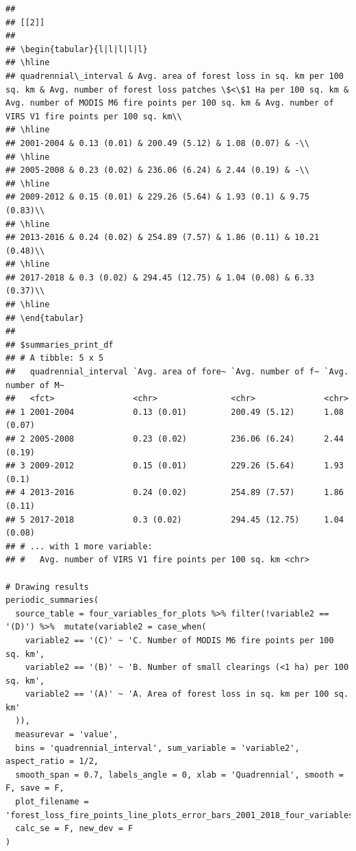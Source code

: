 \documentclass[10pt,landscape,a3paper]{article}
\begin{document}
\begin{verbatim}
## 
## [[2]]
## 
## \begin{tabular}{l|l|l|l|l}
## \hline
## quadrennial\_interval & Avg. area of forest loss in sq. km per 100 sq. km & Avg. number of forest loss patches \$<\$1 Ha per 100 sq. km & Avg. number of MODIS M6 fire points per 100 sq. km & Avg. number of VIRS V1 fire points per 100 sq. km\\
## \hline
## 2001-2004 & 0.13 (0.01) & 200.49 (5.12) & 1.08 (0.07) & -\\
## \hline
## 2005-2008 & 0.23 (0.02) & 236.06 (6.24) & 2.44 (0.19) & -\\
## \hline
## 2009-2012 & 0.15 (0.01) & 229.26 (5.64) & 1.93 (0.1) & 9.75 (0.83)\\
## \hline
## 2013-2016 & 0.24 (0.02) & 254.89 (7.57) & 1.86 (0.11) & 10.21 (0.48)\\
## \hline
## 2017-2018 & 0.3 (0.02) & 294.45 (12.75) & 1.04 (0.08) & 6.33 (0.37)\\
## \hline
## \end{tabular}
## 
## $summaries_print_df
## # A tibble: 5 x 5
##   quadrennial_interval `Avg. area of fore~ `Avg. number of f~ `Avg. number of M~
##   <fct>                <chr>               <chr>              <chr>             
## 1 2001-2004            0.13 (0.01)         200.49 (5.12)      1.08 (0.07)       
## 2 2005-2008            0.23 (0.02)         236.06 (6.24)      2.44 (0.19)       
## 3 2009-2012            0.15 (0.01)         229.26 (5.64)      1.93 (0.1)        
## 4 2013-2016            0.24 (0.02)         254.89 (7.57)      1.86 (0.11)       
## 5 2017-2018            0.3 (0.02)          294.45 (12.75)     1.04 (0.08)       
## # ... with 1 more variable:
## #   Avg. number of VIRS V1 fire points per 100 sq. km <chr>

# Drawing results
periodic_summaries(
  source_table = four_variables_for_plots %>% filter(!variable2 == '(D)') %>%  mutate(variable2 = case_when(
    variable2 == '(C)' ~ 'C. Number of MODIS M6 fire points per 100 sq. km',
    variable2 == '(B)' ~ 'B. Number of small clearings (<1 ha) per 100 sq. km',
    variable2 == '(A)' ~ 'A. Area of forest loss in sq. km per 100 sq. km'
  )),
  measurevar = 'value',
  bins = 'quadrennial_interval', sum_variable = 'variable2', aspect_ratio = 1/2,
  smooth_span = 0.7, labels_angle = 0, xlab = 'Quadrennial', smooth = F, save = F,
  plot_filename = 'forest_loss_fire_points_line_plots_error_bars_2001_2018_four_variables_quadrennial.jpg',
  calc_se = F, new_dev = F
)
\end{verbatim}
\end{document}
